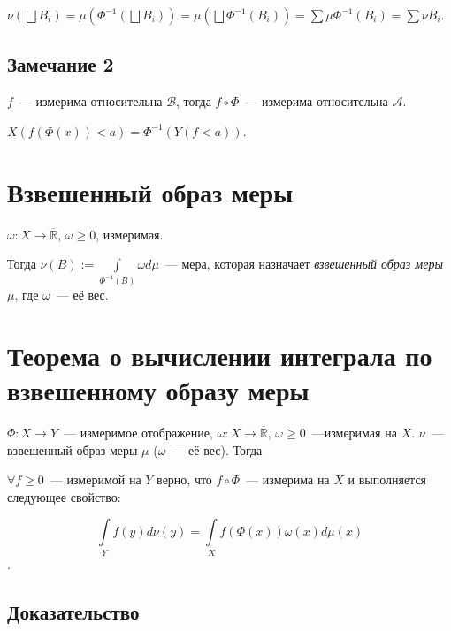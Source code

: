 \documentclass{article}
\begin{document}
            $\nu \left( \bigsqcup B_i \right) = \mu \left( \Phi^{-1} \left( \bigsqcup B_i \right) \right) = \mu \left( \bigsqcup \Phi^{-1}(B_i) \right) = \sum \mu \Phi^{-1}(B_i) = \sum \nu B_i$.
    
        \subsection{Замечание 2}
        
            $f$~--- измерима относительна $\mathcal{B}$, тогда $f \circ \Phi$~--- измерима относительна $\mathcal{A}$. 
            
            $X \left( f \left( \Phi(x) \right) < a \right) = \Phi^{-1} \left( Y (f < a) \right)$.
    
    \newpage
    
    \section{Взвешенный образ меры}
        
        $\omega : X \rightarrow \overline{\mathbb{R}}$, $\omega \geqslant 0$, измеримая. 
        
        Тогда $\nu(B) := \int\limits_{\Phi^{-1}(B)} \omega d \mu$~--- мера, которая назначает \textit{взвешенный образ меры $\mu$}, где $\omega$~--- её вес.
        
    \newpage
    
    \section{Теорема о вычислении интеграла по взвешенному образу меры}
    
        $\Phi : X \rightarrow Y$~--- измеримое отображение, $\omega : X \rightarrow \overline{\mathbb{R}}$, $\omega \geqslant 0$~---измеримая на $X$. $\nu$~--- взвешенный образ меры $\mu$ ($\omega$~--- её вес). Тогда
        
        $\forall f \geqslant 0$~--- измеримой на $Y$ верно, что $f \circ \Phi$~--- измерима на $X$ и выполняется следующее свойство:
        
        $$\int\limits_Y f(y) d \nu(y) = \int\limits_X f (\Phi(x)) \omega(x) d \mu(x)$$.
    
        \subsection{Доказательство}
        
\end{document}
